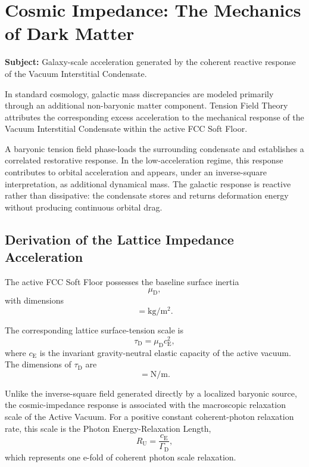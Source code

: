 \chapter{Cosmic Impedance: The Mechanics of Dark Matter}
\label{app:cosmic_impedance}

\noindent\textbf{Subject:} Galaxy-scale acceleration generated by the coherent reactive response of the Vacuum Interstitial Condensate.

In standard cosmology, galactic mass discrepancies are modeled primarily through an additional non-baryonic matter component. Tension Field Theory attributes the corresponding excess acceleration to the mechanical response of the Vacuum Interstitial Condensate within the active FCC Soft Floor.

A baryonic tension field phase-loads the surrounding condensate and establishes a correlated restorative response. In the low-acceleration regime, this response contributes to orbital acceleration and appears, under an inverse-square interpretation, as additional dynamical mass. The galactic response is reactive rather than dissipative: the condensate stores and returns deformation energy without producing continuous orbital drag.

\section{Derivation of the Lattice Impedance Acceleration}

The active FCC Soft Floor possesses the baseline surface inertia
\begin{equation}
    \mu_{\mathrm D},
\end{equation}
with dimensions
\begin{equation}
    [\mu_{\mathrm D}]
    =
    \mathrm{kg/m^2}.
\end{equation}

The corresponding lattice surface-tension scale is
\begin{equation}
    \tau_{\mathrm D}
    =
    \mu_{\mathrm D}c_{\mathrm E}^{2},
\end{equation}
where $c_{\mathrm E}$ is the invariant gravity-neutral elastic capacity of
the active vacuum. The dimensions of $\tau_{\mathrm D}$ are
\begin{equation}
    [\tau_{\mathrm D}]
    =
    \mathrm{N/m}.
\end{equation}

Unlike the inverse-square field generated directly by a localized baryonic
source, the cosmic-impedance response is associated with the macroscopic
relaxation scale of the Active Vacuum. For a positive constant coherent-photon
relaxation rate, this scale is the Photon Energy-Relaxation Length,
\begin{equation}
    R_{\mathrm U}
    =
    \frac{
        c_{\mathrm E}
    }{
        \Gamma_{\mathrm D}
    },
\end{equation}
which represents one e-fold of coherent photon scale relaxation.

